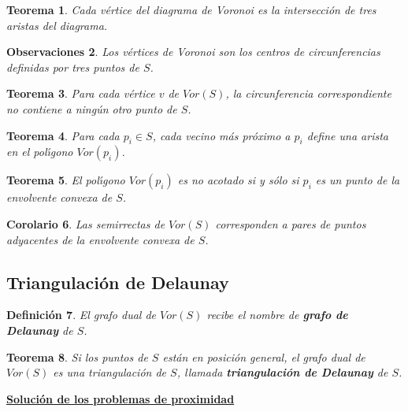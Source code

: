 \documentclass[ebook,oneside]{memoir}
\newtheorem{thm}{Teorema}[chapter]
\newtheorem{coro}[thm]{Corolario}
\newtheorem{defn}[thm]{Definición}
\newtheorem{rem}[thm]{Observaciones}
\begin{document}
\begin{thm} Cada v\'{e}rtice del diagrama de Voronoi es la intersecci\'{o}n de tres aristas del diagrama.
\end{thm}

\begin{rem} Los v\'{e}rtices de Voronoi son los centros de
circunferencias definidas por tres puntos de $S$.
\end{rem}


\begin{thm} Para cada v\'{e}rtice $v$ de $Vor(S)$, la
circunferencia correspondiente no contiene a ning\'{u}n otro punto de
$S$.
\end{thm}

\begin{thm} Para cada $p_i \in S$, cada vecino m\'{a}s
pr\'{o}ximo a $p_i$ define una arista en el pol\'{\i}gono $Vor(p_i)$.
\end{thm}

\begin{thm} El pol\'{\i}gono $Vor(p_i)$ es no acotado si y
s\'{o}lo si $p_i$ es un punto de la envolvente convexa de $S$.
\end{thm}

\begin{coro} Las semirrectas de $Vor(S)$ corresponden a
pares de puntos adyacentes de la envolvente convexa de $S$.
\end{coro}

\subsection{Triangulaci\'on de Delaunay}

\begin{defn} El grafo dual de $Vor(S)$ recibe el nombre de \textbf{grafo de Delaunay} de $S$.
\end{defn}

\begin{thm} Si los puntos de $S$ est\'an en posici\'on
ge\-ne\-ral, el grafo dual de $Vor(S)$ es una triangulaci\'on de
$S$, llamada \textbf{triangulaci\'on de Delaunay} de $S$.
\end{thm}

\textbf{\underline{Soluci\'{o}n de los problemas de proximidad}}
\end{document}
